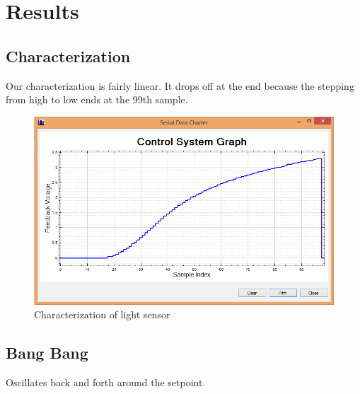 \documentclass[11pt]{article}
\begin{document}
\section{Results}


\subsection{Characterization}
Our characterization is fairly linear. It drops off at the end because the stepping from high to low ends at the 99th sample.

	\begin{figure}[H]\centering
	\includegraphics[height=0.7\textwidth]{images/characterize.png}
	\caption{Characterization of light sensor}
		\label{characterization}
	\end{figure}

\subsection{Bang Bang}
Oscillates back and forth around the setpoint. 
\end{document}
